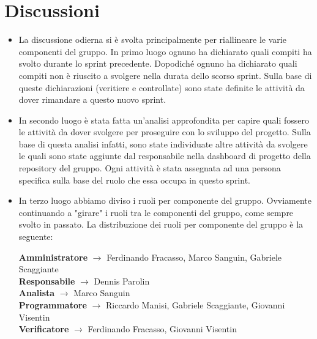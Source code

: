\documentclass[a4paper,12pt]{article}
\begin{document}
\section{Discussioni}
\begin{itemize}
    \item La discussione odierna si è svolta principalmente per riallineare le varie componenti del gruppo. In primo luogo ognuno ha dichiarato quali compiti ha svolto durante lo sprint precedente. Dopodiché ognuno ha dichiarato quali compiti non è riuscito a svolgere nella durata dello scorso sprint. Sulla base di queste dichiarazioni (veritiere e controllate) sono state definite le attività da dover rimandare a questo nuovo sprint.
    \item In secondo luogo è stata fatta un'analisi approfondita per capire quali fossero le attività da dover svolgere per proseguire con lo sviluppo del progetto. Sulla base di questa analisi infatti, sono state individuate altre attività da svolgere le quali sono state aggiunte dal responsabile nella dashboard di progetto della repository del gruppo. Ogni attività è stata assegnata ad una persona specifica sulla base del ruolo che essa occupa in questo sprint.
    \item In terzo luogo abbiamo diviso i ruoli per componente del gruppo. Ovviamente continuando a "girare" i ruoli tra le componenti del gruppo, come sempre svolto in passato. La distribuzione dei ruoli per componente del gruppo è la seguente:
    \begin{center}
        \textbf{Amministratore} $\rightarrow$ Ferdinando Fracasso, Marco Sanguin, Gabriele Scaggiante\\
        \textbf{Responsabile} $\rightarrow$ Dennis Parolin\\
        \textbf{Analista} $\rightarrow$ Marco Sanguin\\
        \textbf{Programmatore} $\rightarrow$ Riccardo Manisi, Gabriele Scaggiante, Giovanni Visentin\\
        \textbf{Verificatore} $\rightarrow$ Ferdinando Fracasso, Giovanni Visentin
    \end{center}
\end{itemize}

\pagebreak
\end{document}
